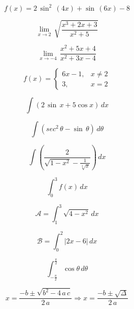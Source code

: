 \documentclass[12pt,a4paper, oneside]{book}
\begin{document}
\begin{equation}
f(x) = 2\,\sin^2\,(4x)  +  \sin\,(6x) - 8
\end{equation}

\begin{equation}
\lim_{x \rightarrow 2} \, \sqrt{\frac{x^3 + 2x + 3}{x^2 + 5}}
\end{equation}

\begin{equation}
\lim_{x \rightarrow -4} \, \frac{x^2 + 5x + 4}{x^2 + 3x -4}
\end{equation}

\begin{equation}
f(x) = \left\lbrace
\begin{array}{cc}
   6x - 1, & x \neq 2 \\
   3, & x = 2
\end{array}
\right.
\end{equation}

\begin{equation}
\int (2\,\sin\,x + 5 \cos x)\, dx
\end{equation}

\begin{equation}
\int (sec^2\,\theta - \sin\,\theta)\,d\theta
\end{equation}

\begin{equation}
\int \left(\frac{2}{\sqrt{1-x^2} - \frac{1}{\sqrt[4]{x}}}\right)\, dx
\end{equation}

\begin{equation}
\int_{0}^{3} f(x)\,dx
\end{equation}

\begin{equation}
\mathcal{A} = \int_{1}^{3}\sqrt{4 - x^2}\,dx
\end{equation}

\begin{equation}
\mathcal{B} = \int_{0}^{2} \vert 2x - 6 \vert \, dx
\end{equation}

\begin{equation}
\int_{-\frac{\pi}{2}}^{\frac{\pi}{2}} \cos\theta\,d\theta
\end{equation}

\begin{equation}
x = \frac{-b \pm \sqrt{b^2 - 4\,a\,c}}{2\,a} \Rightarrow x = \frac{-b \pm \sqrt{\Delta}}{2\,a}
\end{equation}
\end{document}

